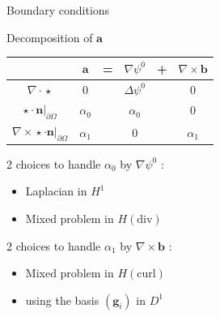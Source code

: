 \documentclass{beamer}
\newcommand{\grad}{{\nabla}}
\newcommand{\laplace}{{\Delta}}
\newcommand{\curl}{{\nabla\times}}
\renewcommand{\div}{{\nabla\cdot}}
\newcommand{\restr}{{\big\rvert_{\partial\Omega}}}
\begin{document}
\begin{frame}{Boundary conditions}
  \label{psi0}
  \begin{block}{Decomposition of $\mathbf{a}$}
    \begin{center}
      \begin{tabular}{c|ccccc}
        & $\mathbf{a}$ & = & $\grad\psi^0$ & + & $\curl \mathbf{b}$ \\ \hline
        $\div\star$ & 0 & & $\laplace\psi^0$ & & 0\\ \hline
        $\star\cdot \mathbf{n}\restr$ & $\alpha_0$ & & $\alpha_0$ & & 0\\ \hline
        $\curl\star\cdot \mathbf{n}\restr$ & $\alpha_1$ & & 0 & & $\alpha_1$
      \end{tabular}
    \end{center}
  \end{block}
  2 choices to handle $\alpha_0$ by $\grad\psi^0$ :
  \begin{itemize}
  \item Laplacian in $H^1$
  \item Mixed problem in $H(\mathrm{div})$
  \end{itemize}
  2 choices to handle $\alpha_1$ by $\curl\mathbf{b}$ :
  \begin{itemize}
  \item Mixed problem in $H(\mathrm{curl})$
  \item using the basis $(\mathbf{g}_i)$ in $D^1$
  \end{itemize}
\end{frame}
\end{document}
